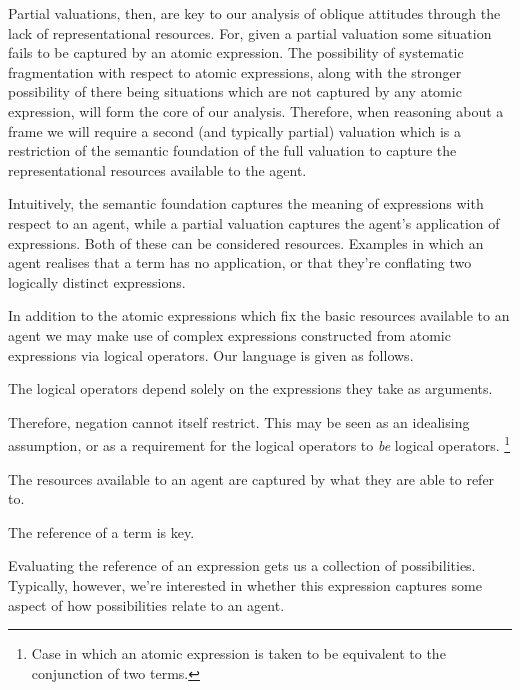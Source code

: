 \documentclass[10pt]{article}
\begin{document}
Partial valuations, then, are key to our analysis of oblique attitudes through the lack of representational resources.
For, given a partial valuation some situation fails to be captured by an atomic expression.
The possibility of systematic fragmentation with respect to atomic expressions, along with the stronger possibility of there being situations which are not captured by any atomic expression, will form the core of our analysis.
Therefore, when reasoning about a frame we will require a second (and typically partial) valuation which is a restriction of the semantic foundation of the full valuation to capture the representational resources available to the agent.

Intuitively, the semantic foundation captures the meaning of expressions with respect to an agent, while a partial valuation captures the agent's application of expressions.
Both of these can be considered resources.
Examples in which an agent realises that a term has no application, or that they're conflating two logically distinct expressions.




In addition to the atomic expressions which fix the basic resources available to an agent we may make use of complex expressions constructed from atomic expressions via logical operators.
Our language is given as follows.

The logical operators depend solely on the expressions they take as arguments.



Therefore, negation cannot itself restrict.
This may be seen as an idealising assumption, or as a requirement for the logical operators to \emph{be} logical operators.\nolinebreak
\footnote{Case in which an atomic expression is taken to be equivalent to the conjunction of two terms.}

The resources available to an agent are captured by what they are able to refer to.






\newpage

The reference of a term is key.

Evaluating the reference of an expression gets us a collection of possibilities.
Typically, however, we're interested in whether this expression captures some aspect of how possibilities relate to an agent.
\end{document}
